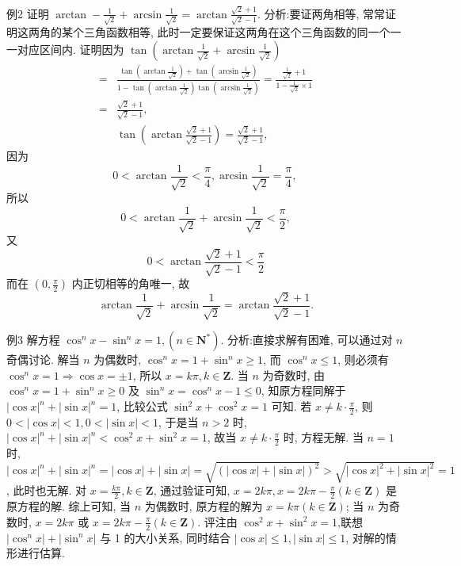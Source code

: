 例2 证明 $\arctan -\frac{1}{\sqrt{2}}+\arcsin \frac{1}{\sqrt{2}}=\arctan \frac{\sqrt{2}+1}{\sqrt{2}-1}$.
分析:要证两角相等, 常常证明这两角的某个三角函数相等, 此时一定要保证这两角在这个三角函数的同一个一一对应区间内.
证明因为 $\tan \left(\arctan \frac{1}{\sqrt{2}}+\arcsin \frac{1}{\sqrt{2}}\right)$
$$
\begin{aligned}
= & \frac{\tan \left(\arctan \frac{1}{\sqrt{2}}\right)+\tan \left(\arcsin \frac{1}{\sqrt{2}}\right)}{1-\tan \left(\arctan \frac{1}{\sqrt{2}}\right) \tan \left(\arcsin \frac{1}{\sqrt{2}}\right)}=\frac{\frac{1}{\sqrt{2}}+1}{1-\frac{1}{\sqrt{2}} \times 1} \\
= & \frac{\sqrt{2}+1}{\sqrt{2}-1}, \\
& \tan \left(\arctan \frac{\sqrt{2}+1}{\sqrt{2}-1}\right)=\frac{\sqrt{2}+1}{\sqrt{2}-1},
\end{aligned}
$$
因为
$$
0<\arctan \frac{1}{\sqrt{2}}<\frac{\pi}{4}, \arcsin \frac{1}{\sqrt{2}}=\frac{\pi}{4} \text {, }
$$
所以
$$
0<\arctan \frac{1}{\sqrt{2}}+\arcsin \frac{1}{\sqrt{2}}<\frac{\pi}{2},
$$
又
$$
0<\arctan \frac{\sqrt{2}+1}{\sqrt{2}-1}<\frac{\pi}{2}
$$
而在 $\left(0, \frac{\pi}{2}\right)$ 内正切相等的角唯一, 故
$$
\arctan \frac{1}{\sqrt{2}}+\arcsin \frac{1}{\sqrt{2}}=\arctan \frac{\sqrt{2}+1}{\sqrt{2}-1} .
$$



例3 解方程 $\cos ^n x-\sin ^n x=1,\left(n \in \mathbf{N}^*\right)$.
分析:直接求解有困难, 可以通过对 $n$ 奇偶讨论.
解当 $n$ 为偶数时, $\cos ^n x=1+\sin ^n x \geqslant 1$, 而 $\cos ^n x \leqslant 1$, 则必须有
$\cos ^n x=1 \Rightarrow \cos x= \pm 1$, 所以 $x=k \pi, k \in \mathbf{Z}$.
当 $n$ 为奇数时, 由 $\cos ^n x=1+\sin ^n x \geqslant 0$ 及 $\sin ^n x=\cos ^n x-1 \leqslant 0$, 知原方程同解于 $|\cos x|^n+|\sin x|^n=1$, 比较公式 $\sin ^2 x+\cos ^2 x=1$ 可知.
若 $x \neq k \cdot \frac{\pi}{2}$, 则 $0<|\cos x|<1,0<|\sin x|<1$, 于是当 $n>2$ 时, $|\cos x|^n+|\sin x|^n<\cos ^2 x+\sin ^2 x=1$, 故当 $x \neq k \cdot \frac{\pi}{2}$ 时, 方程无解.
当 $n=1$ 时, $|\cos x|^n+|\sin x|^n=|\cos x|+|\sin x|= \sqrt{(|\cos x|+|\sin x|)^2}>\sqrt{|\cos x|^2+|\sin x|^2}=1$, 此时也无解.
对 $x=\frac{k \pi}{2}, k \in \mathbf{Z}$, 通过验证可知, $x=2 k \pi, x=2 k \pi-\frac{\pi}{2}(k \in \mathbf{Z})$ 是原方程的解.
综上可知, 当 $n$ 为偶数时, 原方程的解为 $x=k \pi(k \in \mathbf{Z})$; 当 $n$ 为奇数时, $x=2 k \pi$ 或 $x=2 k \pi-\frac{\pi}{2}(k \in \mathbf{Z})$.
评注由 $\cos ^2 x+\sin ^2 x=1$,联想 $\left|\cos ^n x\right|+\left|\sin ^n x\right|$ 与 1 的大小关系, 同时结合 $|\cos x| \leqslant 1,|\sin x| \leqslant 1$, 对解的情形进行估算.



